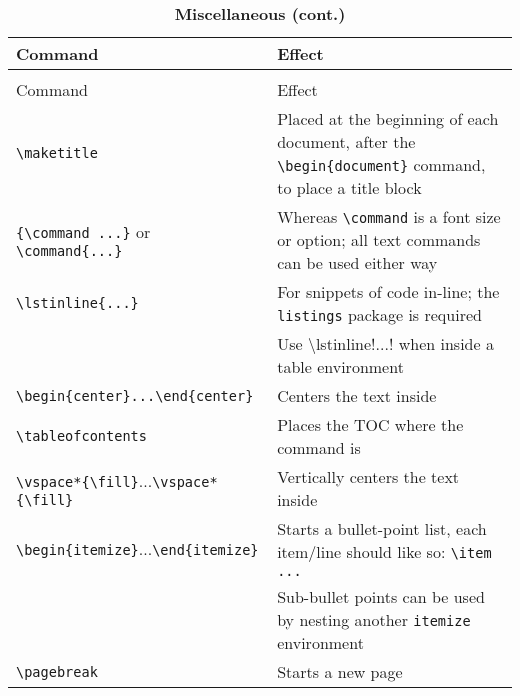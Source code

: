 \documentclass[10pt,letterpaper,landscape]{article}	%
\newcommand{\tabletitle}[1]{{\textbf{\large{#1}}}}
\begin{document}
\begin{longtable}{ @{} l l @{} }
\caption{\tabletitle{Miscellaneous}} \\ \toprule
Command & Effect \\ \midrule
\endfirsthead
\caption{\tabletitle{Miscellaneous (cont.)}} \\ \toprule
Command & Effect \\ \midrule
\endhead
\lstinline!\maketitle! & Placed at the beginning of each document, after the \lstinline!\begin{document}! command, to place a title block \\
\lstinline!{\command ...}! or \lstinline!\command{...}! & Whereas \lstinline!\command! is a font size or option; all text commands can be used either way \\
\lstinline!\lstinline{...}! & For snippets of code in-line; the \lstinline!listings! package is required \\
& Use {\ttfamily\small\textbackslash lstinline!...!} when inside a table environment \\
\lstinline!\begin{center}...\end{center}! & Centers the text inside \\
\lstinline!\tableofcontents! & Places the TOC where the command is \\
\lstinline!\vspace*{\fill}!...\lstinline!\vspace*{\fill}! & Vertically centers the text inside \\
\lstinline!\begin{itemize}!...\lstinline!\end{itemize}! & Starts a bullet-point list, each item/line should like so: \lstinline!\item ...! \\
& Sub-bullet points can be used by  nesting another \lstinline!itemize! environment \\
\lstinline!\pagebreak! & Starts a new page \\
\bottomrule
\end{longtable}
\end{document}
